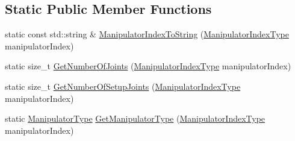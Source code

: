 \subsection*{Static Public Member Functions}
\begin{DoxyCompactItemize}
\item 
static const std\-::string \& \hyperlink{classmts_intuitive_da_vinci_aefc78edaad6191f59d720d0b1b344e89}{Manipulator\-Index\-To\-String} (\hyperlink{classmts_intuitive_da_vinci_a32a63e2057b2c00c8f08685f8f5736f4}{Manipulator\-Index\-Type} manipulator\-Index)
\item 
static size\-\_\-t \hyperlink{classmts_intuitive_da_vinci_a72124ccf78759573acc23db8729eb060}{Get\-Number\-Of\-Joints} (\hyperlink{classmts_intuitive_da_vinci_a32a63e2057b2c00c8f08685f8f5736f4}{Manipulator\-Index\-Type} manipulator\-Index)
\item 
static size\-\_\-t \hyperlink{classmts_intuitive_da_vinci_a4f8cc264ea95312f0592b5fc40caa4a8}{Get\-Number\-Of\-Setup\-Joints} (\hyperlink{classmts_intuitive_da_vinci_a32a63e2057b2c00c8f08685f8f5736f4}{Manipulator\-Index\-Type} manipulator\-Index)
\item 
static \hyperlink{classmts_intuitive_da_vinci_a7a5cc061071f2996eeb0bf812f8b1fb5}{Manipulator\-Type} \hyperlink{classmts_intuitive_da_vinci_aca5d3a34f4bf98b51716ce27c0cd2984}{Get\-Manipulator\-Type} (\hyperlink{classmts_intuitive_da_vinci_a32a63e2057b2c00c8f08685f8f5736f4}{Manipulator\-Index\-Type} manipulator\-Index)
\end{DoxyCompactItemize}
